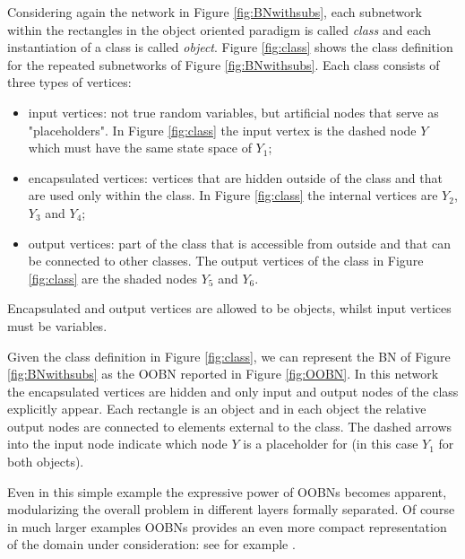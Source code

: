 Considering again the network in Figure \ref{fig:BNwithsubs}, each subnetwork within the rectangles in the object oriented paradigm is called  \textit{class} and each instantiation of a class is called  \textit{object}. Figure \ref{fig:class} shows the class definition for the repeated subnetworks of Figure \ref{fig:BNwithsubs}. Each class consists of three types of vertices:
\begin{itemize}
\item input vertices: not true random variables, but artificial nodes that serve as "placeholders". In Figure \ref{fig:class} the input vertex is the dashed node $Y$ which must have the same state space of $Y_1$;
\item encapsulated vertices: vertices that are hidden outside of the class and that are used only within the class. In Figure \ref{fig:class} the internal vertices are $Y_2$, $Y_3$ and $Y_4$;
\item output vertices: part of the class that is accessible from outside and that can be connected to other classes. The output vertices of the class in Figure \ref{fig:class} are the shaded nodes $Y_5$ and $Y_6$. 
\end{itemize}
Encapsulated and output vertices are allowed to be objects, whilst input vertices must be variables. 

Given the class definition in Figure \ref{fig:class}, we can represent the \gls{BN} of Figure \ref{fig:BNwithsubs} as the \gls{OOBN} reported in Figure \ref{fig:OOBN}.  In this network the encapsulated vertices are hidden and only input and output nodes of the class explicitly appear. Each rectangle is an object and in each object the relative output nodes are connected to elements external to the class. The dashed arrows into the input node indicate which node $Y$ is a placeholder for (in this case $Y_1$ for both objects).

Even in this simple example the expressive power of \glspl{OOBN} becomes apparent, modularizing the overall problem in different layers formally separated. Of course in much larger examples \glspl{OOBN} provides an even more compact representation of the domain under consideration: see for example \citet{Neil2000}.

